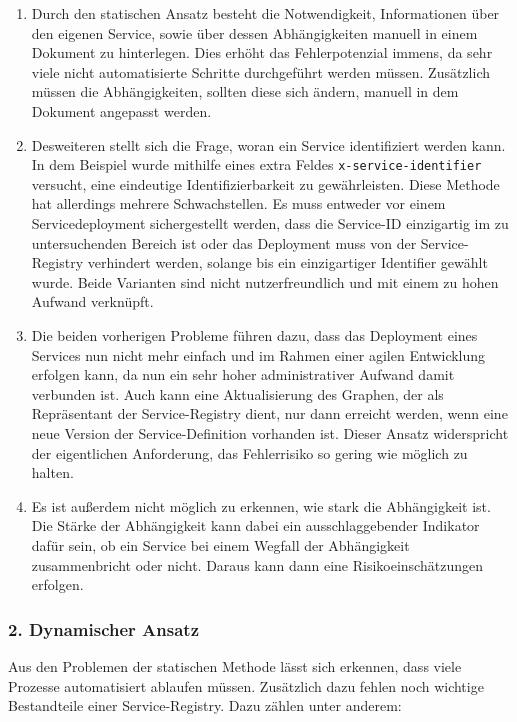 \begin{enumerate}
	\item Durch den statischen Ansatz besteht die Notwendigkeit, Informationen über den eigenen Service, sowie über dessen Abhängigkeiten manuell in einem Dokument zu hinterlegen. Dies erhöht das Fehlerpotenzial immens, da sehr viele nicht automatisierte Schritte durchgeführt werden müssen. Zusätzlich müssen die Abhängigkeiten, sollten diese sich ändern, manuell in dem Dokument angepasst werden.
	\item Desweiteren stellt sich die Frage, woran ein Service identifiziert werden kann. In dem Beispiel wurde mithilfe eines extra Feldes \texttt{x-service-identifier} versucht, eine eindeutige Identifizierbarkeit zu gewährleisten. Diese Methode hat allerdings mehrere Schwachstellen. Es muss entweder vor einem Servicedeployment sichergestellt werden, dass die Service-ID einzigartig im zu untersuchenden Bereich ist oder das Deployment muss von der Service-Registry verhindert werden, solange bis ein einzigartiger Identifier gewählt wurde. Beide Varianten sind nicht nutzerfreundlich und mit einem zu hohen Aufwand verknüpft.
	\item Die beiden vorherigen Probleme führen dazu, dass das Deployment eines Services nun nicht mehr einfach und im Rahmen einer agilen Entwicklung erfolgen kann, da nun ein sehr hoher administrativer Aufwand damit verbunden ist. Auch kann eine Aktualisierung des Graphen, der als Repräsentant der Service-Registry dient, nur dann erreicht werden, wenn eine neue Version der Service-Definition vorhanden ist. Dieser Ansatz widerspricht der eigentlichen Anforderung, das Fehlerrisiko so gering wie möglich zu halten.
	\item Es ist außerdem nicht möglich zu erkennen, wie stark die Abhängigkeit ist. Die Stärke der Abhängigkeit kann dabei ein ausschlaggebender Indikator dafür sein, ob ein Service bei einem Wegfall der Abhängigkeit zusammenbricht oder nicht. Daraus kann dann eine Risikoeinschätzungen erfolgen.
\end{enumerate}

\subsubsection*{2. Dynamischer Ansatz}

Aus den Problemen der statischen Methode lässt sich erkennen, dass viele Prozesse automatisiert ablaufen müssen. Zusätzlich dazu fehlen noch wichtige Bestandteile einer Service-Registry. Dazu zählen unter anderem:

